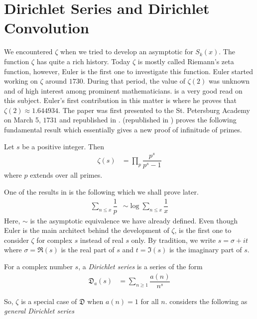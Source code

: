 \documentclass[elemannt.tex]{subfile}
\begin{document}
	\section{Dirichlet Series and Dirichlet Convolution}\label{sec:zeta}
	We encountered $\zeta$ when we tried to develop an asymptotic for $S_{k}(x)$. The function $\zeta$ has quite a rich history. Today $\zeta$ is mostly called Riemann's zeta function, however, Euler is the first one to investigate this function. Euler started working on $\zeta$ around $1730$. During that period, the value of $\zeta(2)$ was unknown and of high interest among prominent mathematicians. \textcite{ayoub_1974} is a very good read on this subject. Euler's first contribution in this matter is \textcite{euler_1738} where he proves that $\zeta(2)\approx 1.644934$. The paper was first presented to the St. Petersburg Academy on March 5, $1731$ and republished in \textcite{euler_2020_a}. \textcite{euler_1744} (republished in \textcite{euler_2020_b}) proves the following fundamental result which essentially gives a new proof of infinitude of primes.
		\begin{theorem}\label{thm:eulerprod}
			Let $s$ be a positive integer. Then
				\begin{align*}
					\zeta(s)
						& = \prod_{p}\dfrac{p^{s}}{p^{s}-1}
				\end{align*}
			where $p$ extends over all primes.
		\end{theorem}
	One of the results in \textcite{euler_1744} is the following which we shall prove later.
		\begin{align*}
			\sum_{n\leq x}\dfrac{1}{p}
			& \sim \log{\sum_{n\leq x}\dfrac{1}{x}}
		\end{align*}
	Here, $\sim$ is the asymptotic equivalence we have already defined. Even though Euler is the main architect behind the development of $\zeta$, \textcite{riemann_1859} is the first one to consider $\zeta$ for complex $s$ instead of real $s$ only. By tradition, we write $s=\sigma+it$ where $\sigma=\Re(s)$ is the real part of $s$ and $t=\Im(s)$ is the imaginary part of $s$.
		\begin{definition}
			For a complex number $s$, a \textit{Dirichlet series} is a series of the form
				\begin{align*}
					\mathfrak{D}_{a}(s)
						& = \sum_{n\geq 1}\dfrac{a(n)}{n^{s}}
				\end{align*}
		\end{definition}
	So, $\zeta$ is a special case of $\mathfrak{D}$ when $a(n)=1$ for all $n$. \textcite[$\S1$, Page $1$]{hardy_riesz_1915} considers the following as \textit{general Dirichlet series}
\end{document}
